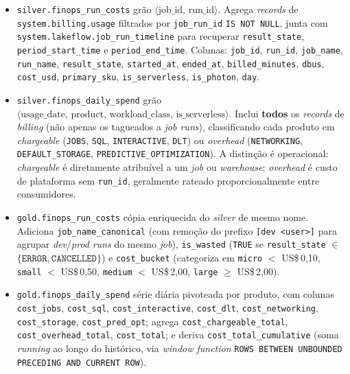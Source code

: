 \documentclass[12pt,a4paper,oneside]{article}
\newcommand{\us}{US\$\,}
\begin{document}
\begin{itemize}\setlength{\itemsep}{4pt}
  \item \texttt{silver.finops\_run\_costs} \textemdash{} grão
        \(\langle\text{job\_id, run\_id}\rangle\). Agrega \textit{records}
        de \texttt{system.billing.usage} filtrados por
        \texttt{job\_run\_id} \texttt{IS NOT NULL}, junta com
        \texttt{system.lakeflow.job\_run\_timeline} para recuperar
        \texttt{result\_state}, \texttt{period\_start\_time} e
        \texttt{period\_end\_time}. Colunas: \texttt{job\_id},
        \texttt{run\_id}, \texttt{job\_name}, \texttt{run\_name},
        \texttt{result\_state}, \texttt{started\_at},
        \texttt{ended\_at}, \texttt{billed\_minutes},
        \texttt{dbus}, \texttt{cost\_usd}, \texttt{primary\_sku},
        \texttt{is\_serverless}, \texttt{is\_photon}, \texttt{day}.

  \item \texttt{silver.finops\_daily\_spend} \textemdash{} grão
        \(\langle\text{usage\_date, product, workload\_class,
        is\_serverless}\rangle\). Inclui \textbf{todos} os
        \textit{records} de \textit{billing} (não apenas os
        tagueados a \textit{job runs}), classificando cada produto
        em \textit{chargeable} (\texttt{JOBS}, \texttt{SQL},
        \texttt{INTERACTIVE}, \texttt{DLT}) ou \textit{overhead}
        (\texttt{NETWORKING}, \texttt{DEFAULT\_STORAGE},
        \texttt{PREDICTIVE\_OPTIMIZATION}). A distinção é
        operacional: \textit{chargeable} é diretamente atribuível
        a um \textit{job} ou \textit{warehouse}; \textit{overhead}
        é custo de plataforma sem \texttt{run\_id}, geralmente
        rateado proporcionalmente entre consumidores.

  \item \texttt{gold.finops\_run\_costs} \textemdash{} cópia
        enriquecida do \textit{silver} de mesmo nome. Adiciona
        \texttt{job\_name\_canonical} (com remoção do prefixo
        \texttt{[dev <user>]} para agrupar \textit{dev}/\textit{prod}
        \textit{runs} do mesmo \textit{job}), \texttt{is\_wasted}
        (\texttt{TRUE} se \texttt{result\_state} \(\in\)
        \(\{\texttt{ERROR}, \texttt{CANCELLED}\}\)) e
        \texttt{cost\_bucket} (categoriza em
        \texttt{micro} \(<\) \us 0{,}10, \texttt{small} \(<\)
        \us 0{,}50, \texttt{medium} \(<\) \us 2{,}00,
        \texttt{large} \(\geq\) \us 2{,}00).

  \item \texttt{gold.finops\_daily\_spend} \textemdash{} série
        diária pivoteada por produto, com colunas
        \texttt{cost\_jobs}, \texttt{cost\_sql},
        \texttt{cost\_interactive}, \texttt{cost\_dlt},
        \texttt{cost\_networking}, \texttt{cost\_storage},
        \texttt{cost\_pred\_opt}; agrega
        \texttt{cost\_chargeable\_total},
        \texttt{cost\_overhead\_total}, \texttt{cost\_total}; e
        deriva \texttt{cost\_total\_cumulative} (soma
        \textit{running} ao longo do histórico, via \textit{window
        function} \texttt{ROWS BETWEEN UNBOUNDED PRECEDING AND
        CURRENT ROW}).
\end{itemize}
\end{document}
